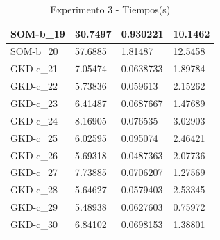 \documentclass[11pt,a4paper]{article}
\begin{document}
\begin{table}[H]
\begin{tabular}{l|l|l|l|}
			\multicolumn{1}{|l|}{SOM-b\_19} & 30.7497        & 0.930221        & 10.1462       \\ \hline
			\multicolumn{1}{|l|}{SOM-b\_20} & 57.6885        & 1.81487         & 12.5458       \\ \hline
			\multicolumn{1}{|l|}{GKD-c\_21} & 7.05474        & 0.0638733       & 1.89784       \\ \hline
			\multicolumn{1}{|l|}{GKD-c\_22} & 5.73836        & 0.059613        & 2.15262       \\ \hline
			\multicolumn{1}{|l|}{GKD-c\_23} & 6.41487        & 0.0687667       & 1.47689       \\ \hline
			\multicolumn{1}{|l|}{GKD-c\_24} & 8.16905        & 0.076535        & 3.02903       \\ \hline
			\multicolumn{1}{|l|}{GKD-c\_25} & 6.02595        & 0.095074        & 2.46421       \\ \hline
			\multicolumn{1}{|l|}{GKD-c\_26} & 5.69318        & 0.0487363       & 2.07736       \\ \hline
			\multicolumn{1}{|l|}{GKD-c\_27} & 7.73885        & 0.0706207       & 1.27569       \\ \hline
			\multicolumn{1}{|l|}{GKD-c\_28} & 5.64627        & 0.0579403       & 2.53345       \\ \hline
			\multicolumn{1}{|l|}{GKD-c\_29} & 5.48938        & 0.0627603       & 0.75972       \\ \hline
			\multicolumn{1}{|l|}{GKD-c\_30} & 6.84102        & 0.0698153       & 1.38801       \\ \hline
		\end{tabular}
		\caption{ Experimento 3 - Tiempos(s) }
		\label{tiempos3}
	\end{table}
	
\end{document}
